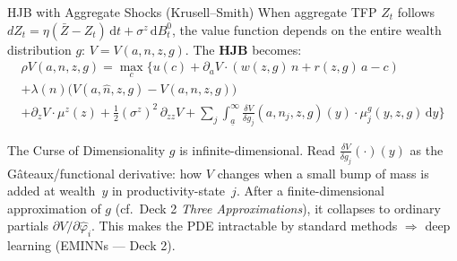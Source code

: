 \documentclass[aspectratio=169,11pt]{beamer}
\newcommand{\emphc}[1]{\textcolor{harvardcrimson}{#1}}
\newcommand{\ud}{\,\mathrm{d}}
\newcommand{\ubar}[1]{\underline{#1}}
\begin{document}
\begin{frame}{HJB with Aggregate Shocks (Krusell--Smith)}
\small
When aggregate TFP $Z_t$ follows $dZ_t = \eta(\bar{Z} - Z_t)\ud t + \sigma^z \ud B_t^0$,
the value function depends on the \emphc{entire wealth distribution} $g$: $V = V(a, n, z, g)$.
The \textbf{HJB} becomes:
\vspace{-0.3em}
\begin{multline*}
\rho V(a,n,z,g) = \max_c\Big\{u(c) + \partial_a V\cdot(w(z,g)\,n + r(z,g)\,a - c)\\
+ \lambda(n)\big(V(a,\hat{n},z,g) - V(a,n,z,g)\big)\\
+ \partial_z V\cdot\mu^z(z) + \tfrac{1}{2}(\sigma^z)^2\,\partial_{zz}V + \sum_j \int_{\ubar{a}}^\infty \frac{\delta V}{\delta g_j}(a, n_j, z, g)(y) \cdot \mu^g_j(y,z,g) \ud y \Big\}
\end{multline*}
\vspace{-0.8em}
\begin{alertblock}{\small The Curse of Dimensionality}
\small
$g$ is \emphc{infinite-dimensional}. Read $\frac{\delta V}{\delta g_j}(\cdot)(y)$ as the Gâteaux/functional derivative: how $V$ changes when a small bump of mass is added at wealth~$y$ in productivity-state~$j$. After a finite-dimensional approximation of $g$ (cf.\ Deck 2 \textit{Three Approximations}), it collapses to ordinary partials $\partial V/\partial\hat\varphi_i$. This makes the PDE intractable by standard methods $\Rightarrow$ \emphc{deep learning} (EMINNs --- Deck 2).
\end{alertblock}
\end{frame}
\end{document}
